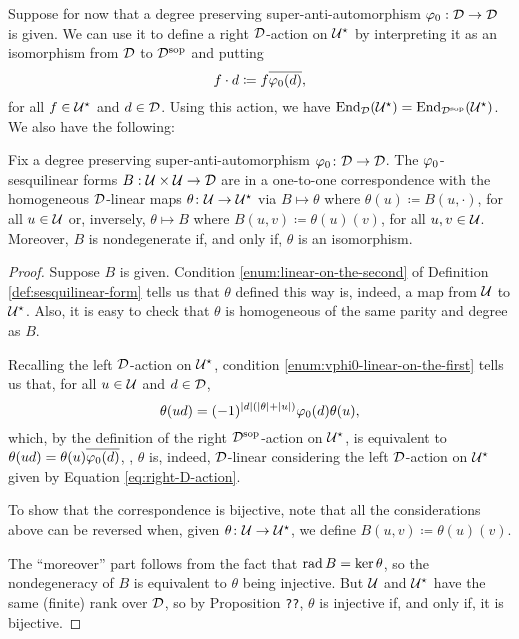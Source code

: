 \documentclass{amsbook}
\begin{document}
Suppose for now that a degree preserving su\-per\--an\-ti\--auto\-mor\-phism $\varphi_0: \mathcal{D} \to \mathcal{D}$ is given. 
We can use it to define a right $\mathcal{D}$-action on $\mathcal U^\star$ by interpreting it as an isomorphism from $\mathcal{D}$ to $\mathcal{D}^{\mathrm{sop}}$ and putting 
%
\begin{equation}\label{eq:right-D-action}
    f\cdot d \coloneqq f \overline{\varphi_0(d)},
\end{equation}
%
for all $f \in \mathcal U^\star$ and $d\in \mathcal{D}$. 
Using this action, we have $\operatorname{End}_{\mathcal{D}} (\mathcal U^\star) = \operatorname{End}_{\mathcal{D}^{\mathrm{sop}}} (\mathcal U^\star)$. We also have the following:

\begin{prop}\label{prop:sesquilinear-form-iff-D-linear-map}
    Fix a degree preserving su\-per\--an\-ti\--auto\-mor\-phism $\varphi_0\colon \mathcal{D} \to \mathcal{D}$. 
    The $\varphi_0$-sesquilinear forms $B:\mathcal U\times\mathcal U \to \mathcal{D}$ are in a one-to-one correspondence with the homogeneous $\mathcal{D}$-linear maps $\theta\colon \mathcal U \to \mathcal U^\star$ via $B \mapsto \theta$ where $\theta(u) \coloneqq B(u, \cdot)$, for all $u \in \mathcal U$ or, inversely, $\theta \mapsto B$ where $B(u,v) \coloneqq \theta(u)(v)$, for all $u, v\in \mathcal U$. 
    Moreover, $B$ is nondegenerate if, and only if, $\theta$ is an isomorphism.
\end{prop}

\begin{proof}
    Suppose $B$ is given. Condition \eqref{enum:linear-on-the-second} of Definition \ref{def:sesquilinear-form} tells us that $\theta$ defined this way is, indeed, a map from $\mathcal U$ to $\mathcal U^\star$. 
    Also, it is easy to check that $\theta$ is homogeneous of the same parity and degree as $B$.
    
    Recalling the left $\mathcal{D}$-action on $\mathcal U^\star$, condition \eqref{enum:vphi0-linear-on-the-first} tells us that, for all $u\in \mathcal U$ and $d\in \mathcal{D}$,
    \[
        \theta (ud) = (-1)^{|d|(|\theta|+|u|)}\varphi_0 (d) \theta (u),
    \]
    which, by the definition of the right $\mathcal{D}^{\mathrm{sop}}$-action on $\mathcal U^\star$, is equivalent to $\theta(ud) = \theta(u) \overline{\varphi_0(d)}$, \ie, $\theta$ is, indeed, $\mathcal{D}$-linear considering the left $\mathcal{D}$-action on $\mathcal U^\star$ given by Equation \eqref{eq:right-D-action}.
    
    To show that the correspondence is bijective, note that all the considerations above can be reversed when, given $\theta\colon \mathcal U \to \mathcal U^\star$, we define  $B(u, v) \coloneqq \theta(u)(v)$.
    
    The ``moreover'' part follows from the fact that $\operatorname{rad} B = \ker \theta$, so the nondegeneracy of $B$ is equivalent to $\theta$ being injective. But $\mathcal U$ and $\mathcal U^\star$ have the same (finite) rank over $\mathcal{D}$, so by Proposition {\tt ??}, $\theta$ is injective if, and only if, it is bijective.
\end{proof}
\end{document}
